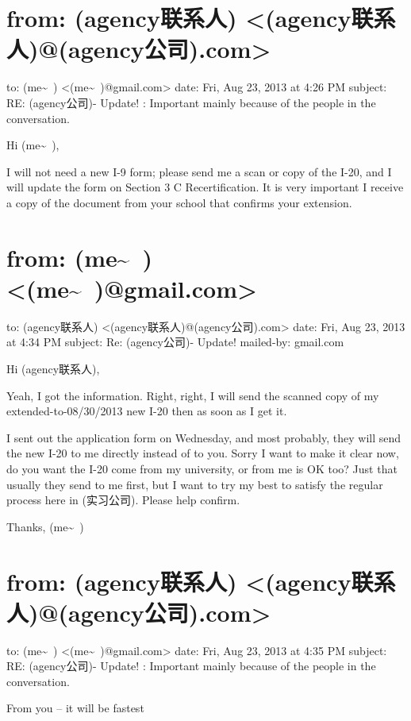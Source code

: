 \documentclass[12pt]{book}
\begin{document}
\section{from:         (agency联系人) <(agency联系人)@(agency公司).com>}
\label{sec-35-17}
to:         (me\textasciitilde{}~) <(me\textasciitilde{}~)@gmail.com>
date:         Fri, Aug 23, 2013 at 4:26 PM
subject:         RE: (agency公司)- Update!
:         Important mainly because of the people in the conversation.

Hi (me\textasciitilde{}~),

I will not need a new I-9 form; please send me a scan or copy of the I-20, and I will update the form on Section 3 C Recertification. It is very important I receive a copy of the document from your school that confirms your extension.


\section{from:         (me\textasciitilde{}~) <(me\textasciitilde{}~)@gmail.com>}
\label{sec-35-18}
to:         (agency联系人) <(agency联系人)@(agency公司).com>
date:         Fri, Aug 23, 2013 at 4:34 PM
subject:         Re: (agency公司)- Update!
mailed-by:         gmail.com

Hi (agency联系人), 

Yeah, I got the information. Right, right, I will send the scanned copy of my extended-to-08/30/2013 new I-20 then as soon as I get it. 

I sent out the application form on Wednesday, and most probably, they will send the new I-20 to me directly instead of to you. Sorry I want to make it clear now, do you want the I-20 come from my university, or from me is OK too? Just that usually they send to me first, but I want to try my best to satisfy the regular process here in (实习公司). Please help confirm. 

Thanks,
(me\textasciitilde{}~)


\section{from:         (agency联系人) <(agency联系人)@(agency公司).com>}
\label{sec-35-19}
to:         (me\textasciitilde{}~) <(me\textasciitilde{}~)@gmail.com>
date:         Fri, Aug 23, 2013 at 4:35 PM
subject:         RE: (agency公司)- Update!
:         Important mainly because of the people in the conversation.

From you -- it will be fastest
\end{document}

